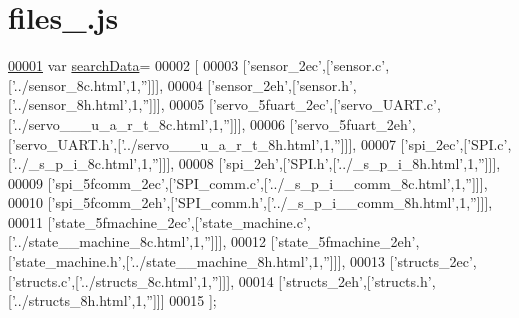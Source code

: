 \hypertarget{files__7_8js_source}{}\section{files\+\_.\+js}
\label{files__7_8js_source}

\begin{DoxyCode}
\hypertarget{files__7_8js_source.tex_l00001}{}\hyperlink{files__7_8js_ad01a7523f103d6242ef9b0451861231e}{00001} var \hyperlink{files__7_8js_ad01a7523f103d6242ef9b0451861231e}{searchData}=
00002 [
00003   [\textcolor{stringliteral}{'sensor\_2ec'},[\textcolor{stringliteral}{'sensor.c'},[\textcolor{stringliteral}{'../sensor\_8c.html'},1,\textcolor{stringliteral}{''}]]],
00004   [\textcolor{stringliteral}{'sensor\_2eh'},[\textcolor{stringliteral}{'sensor.h'},[\textcolor{stringliteral}{'../sensor\_8h.html'},1,\textcolor{stringliteral}{''}]]],
00005   [\textcolor{stringliteral}{'servo\_5fuart\_2ec'},[\textcolor{stringliteral}{'servo\_UART.c'},[\textcolor{stringliteral}{'../servo\_\_\_u\_a\_r\_t\_8c.html'},1,\textcolor{stringliteral}{''}]]],
00006   [\textcolor{stringliteral}{'servo\_5fuart\_2eh'},[\textcolor{stringliteral}{'servo\_UART.h'},[\textcolor{stringliteral}{'../servo\_\_\_u\_a\_r\_t\_8h.html'},1,\textcolor{stringliteral}{''}]]],
00007   [\textcolor{stringliteral}{'spi\_2ec'},[\textcolor{stringliteral}{'SPI.c'},[\textcolor{stringliteral}{'../\_s\_p\_i\_8c.html'},1,\textcolor{stringliteral}{''}]]],
00008   [\textcolor{stringliteral}{'spi\_2eh'},[\textcolor{stringliteral}{'SPI.h'},[\textcolor{stringliteral}{'../\_s\_p\_i\_8h.html'},1,\textcolor{stringliteral}{''}]]],
00009   [\textcolor{stringliteral}{'spi\_5fcomm\_2ec'},[\textcolor{stringliteral}{'SPI\_comm.c'},[\textcolor{stringliteral}{'../\_s\_p\_i\_\_comm\_8c.html'},1,\textcolor{stringliteral}{''}]]],
00010   [\textcolor{stringliteral}{'spi\_5fcomm\_2eh'},[\textcolor{stringliteral}{'SPI\_comm.h'},[\textcolor{stringliteral}{'../\_s\_p\_i\_\_comm\_8h.html'},1,\textcolor{stringliteral}{''}]]],
00011   [\textcolor{stringliteral}{'state\_5fmachine\_2ec'},[\textcolor{stringliteral}{'state\_machine.c'},[\textcolor{stringliteral}{'../state\_\_machine\_8c.html'},1,\textcolor{stringliteral}{''}]]],
00012   [\textcolor{stringliteral}{'state\_5fmachine\_2eh'},[\textcolor{stringliteral}{'state\_machine.h'},[\textcolor{stringliteral}{'../state\_\_machine\_8h.html'},1,\textcolor{stringliteral}{''}]]],
00013   [\textcolor{stringliteral}{'structs\_2ec'},[\textcolor{stringliteral}{'structs.c'},[\textcolor{stringliteral}{'../structs\_8c.html'},1,\textcolor{stringliteral}{''}]]],
00014   [\textcolor{stringliteral}{'structs\_2eh'},[\textcolor{stringliteral}{'structs.h'},[\textcolor{stringliteral}{'../structs\_8h.html'},1,\textcolor{stringliteral}{''}]]]
00015 ];
\end{DoxyCode}
